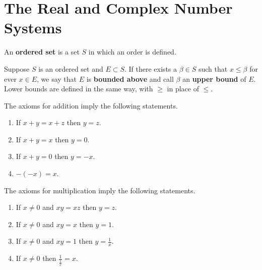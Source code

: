 \chapter{The Real and Complex Number Systems}
\setcounter{theorem}{5}
\begin{definition}
	\label{definition-1.6}
	An \textbf{ordered set} is a set $S$ in which an order is defined.
\end{definition}

\begin{definition}
	\label{definition-1.7}
	Suppose $S$ is an ordered set and $E \subset S$. If there exists a $\beta \in S$ such that $x \leq \beta$ for ever $x \in E$, we say that $E$ is \textbf{bounded above} and call $\beta$ an \textbf{upper bound} of $E$.
	\newline\newline
	Lower bounds are defined in the same way, with $\geq$ in place of $\leq$.
\end{definition}

\setcounter{theorem}{13}
\begin{pproposition}
	\label{pproposition-1.14}
	The axioms for addition imply the following statements.
	\renewcommand{\labelenumi}{(\alph{enumi})}
	\begin{enumerate}
		\item If $x + y = x + z$ then $y = z$.
		\item If $x + y = x$ then $y = 0$.
		\item If $x + y = 0$ then $y = -x$.
		\item $- \left( -x \right) = x$.
	\end{enumerate}
\end{pproposition}

\begin{pproposition}
	\label{pproposition-1.15}
	The axioms for multiplication imply the following statements.
	\renewcommand{\labelenumi}{(\alph{enumi})}
	\begin{enumerate}
		\item If $x \neq 0$ and $xy = xz$ then $y = z$.
		\item If $x \neq 0$ and $xy = x$ then $y = 1$.
		\item If $x \neq 0$ and $xy = 1$ then $y = \frac{1}{x}$.
		\item If $x \neq 0$ then $\frac{1}{\frac{1}{x}} = x$.
	\end{enumerate}
\end{pproposition}


